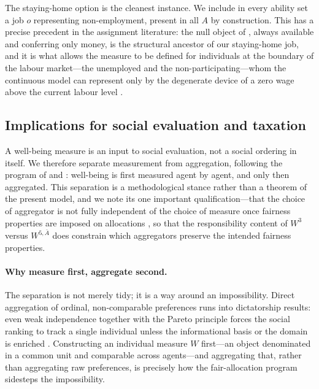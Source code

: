 The staying-home option is the cleanest instance. We include in every ability
set a job $o$ representing non-employment, present in all $A$ by construction.
This has a precise precedent in the assignment literature: the null object of
\citet{Maniquet2008}, always available and conferring only money, is the
structural ancestor of our staying-home job, and it is what allows the measure
to be defined for individuals at the boundary of the labour market---the
unemployed and the non-participating---whom the continuous model can represent
only by the degenerate device of a zero wage above the current labour level
\textcite[cf.][]{FleurbaeyManiquet2007}.

\subsection{Implications for social evaluation and taxation}
\label{sub:swf}

A well-being measure is an input to social evaluation, not a social ordering
in itself. We therefore separate measurement from aggregation, following the
program of \citet{FleurbaeyManiquet2017} and \citet{fleurbaey_maniquet_2019}:
well-being is first measured agent by agent, and only then aggregated. This
separation is a methodological stance rather than a theorem of the present
model, and we note its one important qualification---that the choice of
aggregator is not fully independent of the choice of measure once fairness
properties are imposed on allocations
\textcite[][p.~785]{fleurbaey_maniquet_2019}, so that the responsibility content
of $W^3$ versus $W^{5,\bar A}$ does constrain which aggregators preserve the
intended fairness properties.

\paragraph{Why measure first, aggregate second.}
The separation is not merely tidy; it is a way around an impossibility. Direct
aggregation of ordinal, non-comparable preferences runs into dictatorship
results: even weak independence together with the Pareto principle forces the
social ranking to track a single individual unless the informational basis or
the domain is enriched \textcite{FleurbaeyTadenuma2007}. Constructing an
individual measure $W$ first---an object denominated in a common unit and
comparable across agents---and aggregating that, rather than aggregating raw
preferences, is precisely how the fair-allocation program sidesteps the
impossibility.

